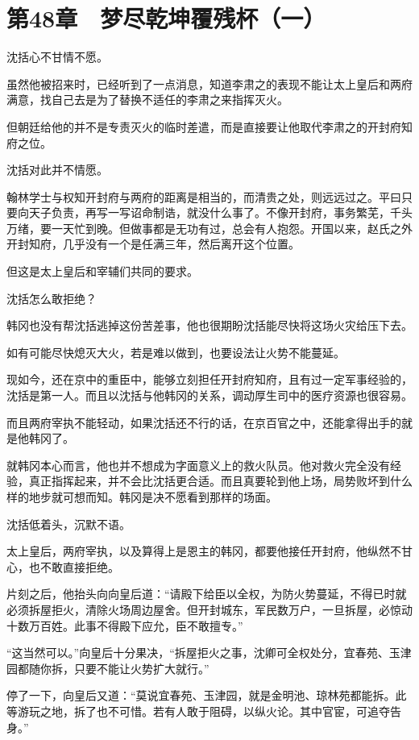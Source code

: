 \section{第48章　梦尽乾坤覆残杯（一）}

沈括心不甘情不愿。

虽然他被招来时，已经听到了一点消息，知道李肃之的表现不能让太上皇后和两府满意，找自己去是为了替换不适任的李肃之来指挥灭火。

但朝廷给他的并不是专责灭火的临时差遣，而是直接要让他取代李肃之的开封府知府之位。

沈括对此并不情愿。

翰林学士与权知开封府与两府的距离是相当的，而清贵之处，则远远过之。平曰只要向天子负责，再写一写诏命制诰，就没什么事了。不像开封府，事务繁芜，千头万绪，要一天忙到晚。但做事都是无功有过，总会有人抱怨。开国以来，赵氏之外开封知府，几乎没有一个是任满三年，然后离开这个位置。

但这是太上皇后和宰辅们共同的要求。

沈括怎么敢拒绝？

韩冈也没有帮沈括逃掉这份苦差事，他也很期盼沈括能尽快将这场火灾给压下去。

如有可能尽快熄灭大火，若是难以做到，也要设法让火势不能蔓延。

现如今，还在京中的重臣中，能够立刻担任开封府知府，且有过一定军事经验的，沈括是第一人。而且以沈括与他韩冈的关系，调动厚生司中的医疗资源也很容易。

而且两府宰执不能轻动，如果沈括还不行的话，在京百官之中，还能拿得出手的就是他韩冈了。

就韩冈本心而言，他也并不想成为字面意义上的救火队员。他对救火完全没有经验，真正指挥起来，并不会比沈括更合适。而且真要轮到他上场，局势败坏到什么样的地步就可想而知。韩冈是决不愿看到那样的场面。

沈括低着头，沉默不语。

太上皇后，两府宰执，以及算得上是恩主的韩冈，都要他接任开封府，他纵然不甘心，也不敢直接拒绝。

片刻之后，他抬头向向皇后道：“请殿下给臣以全权，为防火势蔓延，不得已时就必须拆屋拒火，清除火场周边屋舍。但开封城东，军民数万户，一旦拆屋，必惊动十数万百姓。此事不得殿下应允，臣不敢擅专。”

“这当然可以。”向皇后十分果决，“拆屋拒火之事，沈卿可全权处分，宜春苑、玉津园都随你拆，只要不能让火势扩大就行。”

停了一下，向皇后又道：“莫说宜春苑、玉津园，就是金明池、琼林苑都能拆。此等游玩之地，拆了也不可惜。若有人敢于阻碍，以纵火论。其中官宦，可追夺告身。”

